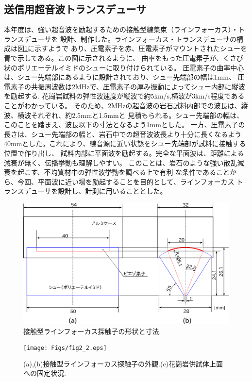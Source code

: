 \subsection{送信用超音波トランスデューサ}
本年度は、強い超音波を励起するための接触型線集束（ラインフォーカス）・トランスデューサを
設計、制作した。ラインフォーカス・トランスデューサの構成は図\ref{fig:fig2}に示すようで
あり、圧電素子を赤、圧電素子がマウントされたシューを青で示してある。この図に示されるように、
曲率をもった圧電素子が、くさび状のポリエーテルイミドのシューに取り付けられている。
圧電素子の曲率中心は、シュー先端部にあるように設計されており、シュー先端部の幅は1mm、
圧電素子の共振周波数は2MHzで、圧電素子の厚み振動によってシュー内部に縦波を励起する.
花崗岩試料の弾性波速度が縦波で約5km/s,横波が3km/s程度であることがわかっている。
そのため、2MHzの超音波の岩石試料内部での波長は、縦波、横波それぞれ、約2.5mmと1.5mmと
見積もられる。シュー先端部の幅は、このことを踏まえ、波長以下の寸法となるよう1mmとした。
一方、圧電素子の長さは、シュー先端部の幅と、岩石中での超音波波長より十分に長くなるよう
40mmとした。これにより、線音源に近い状態をシュー先端部が試料に接触する位置で作り出し、
試料内部に平面波を励起する。完全な平面波は、距離による減衰が無く、伝播挙動も理解しやすい。
このことは、岩石のような強い散乱減衰を起こす、不均質材中の弾性波挙動を調べる上で有利
な条件であることから、今回、平面波に近い場を励起することを目的として、ラインフォーカス
トランスデューサを設計し、計測に用いることとした。
\begin{figure}[h]
	\begin{center}
	\includegraphics[width=0.8\linewidth]{Figs/fig2.eps} 
	\end{center}
	\caption{
		接触型ラインフォーカス探触子の形状と寸法.
	} 
	\label{fig:fig2}
\end{figure}
\begin{figure}[h]
	\begin{center}
	\texttt{[image: Figs/fig2\_2.eps]} 
	\end{center}
	\caption{
		(a),(b)接触型ラインフォーカス探触子の外観.(c)花崗岩供試体上面への固定状況.
	} 
	\label{fig:fig2_2}
\end{figure}
